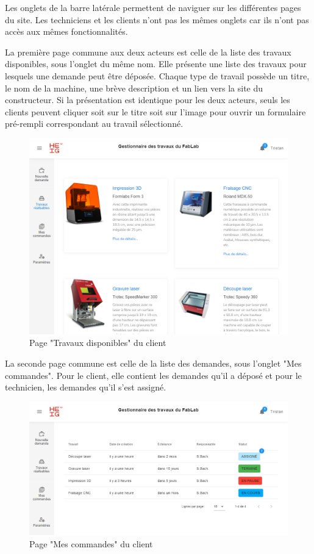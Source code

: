 \documentclass[
    iai, %
    eai, %
]{heig-tb}
\begin{document}
Les onglets de la barre latérale permettent de naviguer sur les différentes pages du site. Les techniciens et les clients n'ont pas les mêmes onglets car ils n'ont pas accès aux mêmes fonctionnalités.

\newpage
La première page commune aux deux acteurs est celle de la liste des travaux disponibles, sous l'onglet du même nom. Elle présente une liste des travaux pour lesquels une demande peut être déposée.
Chaque type de travail possède un titre, le nom de la machine, une brève description et un lien vers la site du constructeur. Si la présentation est identique pour les deux acteurs, seuls les clients peuvent cliquer soit sur le titre soit sur l'image pour ouvrir un formulaire pré-rempli correspondant au travail sélectionné.

\begin{figure}[h]
  \includegraphics[width=14cm]{ui_joblist_page.PNG}
  \caption{Page "Travaux disponibles" du client}
\end{figure}

La seconde page commune est celle de la liste des demandes, sous l'onglet "Mes commandes". Pour le client, elle contient les demandes qu'il a déposé et pour le technicien, les demandes qu'il s'est assigné.

\begin{figure}[h]
  \includegraphics[width=14cm]{ui_myjobs_client.PNG}
  \caption{Page "Mes commandes" du client}
\end{figure}
\end{document}
